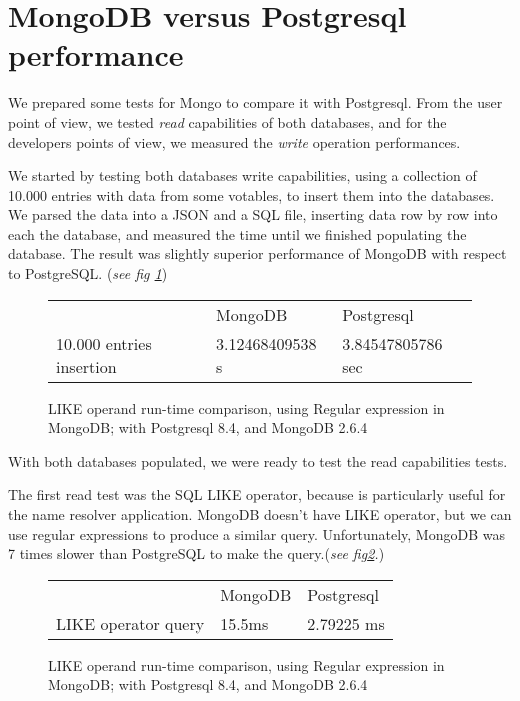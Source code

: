\documentclass[11pt,twoside]{article}
\begin{document}
\section{MongoDB versus Postgresql performance}
    We prepared some tests for Mongo to compare it with Postgresql. From the user
    point of view, we tested \emph{read} capabilities of both databases, and
    for the developers points of view, we measured the \emph{write} operation
    performances.
    
    We started by testing both databases write capabilities, using a collection of 10.000 entries with data from some votables,
    to insert them into the databases. We parsed the data into a JSON and a SQL file, 
    inserting data row by row into each the database, and measured the time until we 
    finished populating the database. The result was slightly superior
    performance of MongoDB with respect to PostgreSQL. (\emph{see fig \ref{fig:insert}})
    
 \begin{figure}
    \centering
    \begin{tabular}{lll}    
                        & MongoDB & Postgresql \\
    10.000 entries insertion & 3.12468409538 s  & 3.84547805786 sec
    \end{tabular}
    \caption{LIKE operand run-time comparison, using Regular expression in MongoDB; with Postgresql 8.4, and MongoDB 2.6.4}
    \label{fig:insert}
\end{figure}   
    
    With both databases populated, we were ready to test the read capabilities tests.
    
    The first read test was the SQL LIKE operator, because is particularly
    useful for the name resolver application. 
    MongoDB doesn't have LIKE operator, but we can use regular expressions to
    produce a similar query. Unfortunately, MongoDB was 7 times slower than
    PostgreSQL to make the query.(\emph{see fig\ref{fig:like}.})
\begin{figure}
    \centering
    \begin{tabular}{lll}    
                        & MongoDB & Postgresql \\
    LIKE operator query & 15.5ms  & 2.79225 ms
    \end{tabular}
    \caption{LIKE operand run-time comparison, using Regular expression in MongoDB; with Postgresql 8.4, and MongoDB 2.6.4}
    \label{fig:like}
\end{figure}
\end{document}
